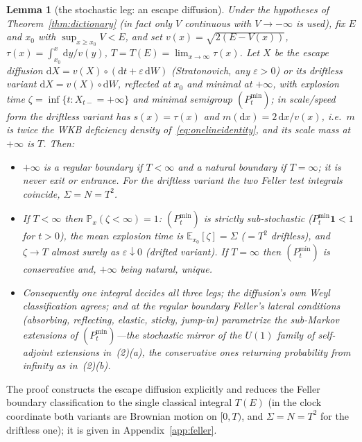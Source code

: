 \documentclass[11pt]{article}
\newtheorem{lemma}[theorem]{Lemma}
\theoremstyle{definition}
\theoremstyle{remark}
\newcommand{\dd}{\mathrm{d}}
\newcommand{\Prob}{\mathbb{P}}
\newcommand{\EE}{\mathbb{E}}
\begin{document}
\begin{lemma}[the stochastic leg: an escape diffusion]
\label{lem:feller}
Under the hypotheses of Theorem~\ref{thm:dictionary} (in fact only $V$
continuous with $V\to-\infty$ is used), fix $E$ and $x_{0}$ with
$\sup_{x\ge x_{0}}V<E$, and set $v(x)=\sqrt{2(E-V(x))}$,
$\tau(x)=\int_{x_{0}}^{x}\dd y/v(y)$, $T=T(E)=\lim_{x\to\infty}\tau(x)$. Let
$X$ be the escape diffusion
$\dd X=v(X)\circ(\dd t+\varepsilon\,\dd W)$ (Stratonovich, any
$\varepsilon>0$) or its driftless variant $\dd X=v(X)\circ\dd W$, reflected
at $x_{0}$ and minimal at $+\infty$, with explosion time
$\zeta=\inf\{t:X_{t-}=+\infty\}$ and minimal semigroup $(P^{\min}_{t})$; in
scale/speed form the driftless variant has $s(x)=\tau(x)$ and
$m(\dd x)=2\,\dd x/v(x)$, i.e.\ $m$ is twice the WKB deficiency density
of~\eqref{eq:onelineidentity}, and its scale mass at $+\infty$ is $T$. Then:
\begin{itemize}
\item[(i)] $+\infty$ is a \emph{regular} boundary if $T<\infty$ and a
\emph{natural} boundary if $T=\infty$; it is never exit or entrance. For the
driftless variant the two Feller test integrals coincide,
$\Sigma=N=T^{2}$.
\item[(ii)] If $T<\infty$ then $\Prob_{x}(\zeta<\infty)=1$: $(P^{\min}_{t})$
is strictly sub-stochastic ($P^{\min}_{t}\mathbf 1<1$ for $t>0$), the mean
explosion time is $\EE_{x_{0}}[\zeta]=\Sigma$ ($=T^{2}$ driftless), and
$\zeta\to T$ almost surely as $\varepsilon\downarrow0$ (drifted variant). If $T=\infty$ then
$(P^{\min}_{t})$ is conservative and, $+\infty$ being natural, unique.
\item[(iii)] Consequently one integral decides all three legs; the
diffusion's own Weyl classification agrees; and at the regular boundary
Feller's lateral conditions (absorbing, reflecting, elastic, sticky,
jump-in) parametrize the sub-Markov extensions of $(P^{\min}_{t})$---the
stochastic mirror of the $U(1)$ family of self-adjoint extensions in~(2)(a),
the conservative ones returning probability from infinity as in~(2)(b).
\end{itemize}
\end{lemma}

The proof constructs the escape diffusion explicitly and reduces the Feller
boundary classification to the single classical integral $T(E)$ (in the
clock coordinate both variants are Brownian motion on $[0,T)$, and
$\Sigma=N=T^{2}$ for the driftless one); it is given in
Appendix~\ref{app:feller}.
\end{document}
